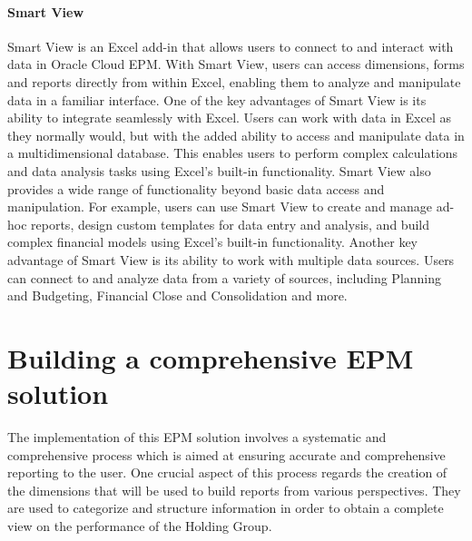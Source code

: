 \documentclass[12pt,a4paper,openright,twoside]{book}
\begin{document}
\paragraph{Smart View}

Smart View is an Excel add-in that allows users to connect to and interact with data in Oracle Cloud EPM. 
%
With Smart View, users can access dimensions, forms and reports directly from within Excel, enabling them to analyze and manipulate data in a familiar interface.
%
One of the key advantages of Smart View is its ability to integrate seamlessly with Excel. 
%
Users can work with data in Excel as they normally would, but with the added ability to access and manipulate data in a multidimensional database. 
%
This enables users to perform complex calculations and data analysis tasks using Excel's built-in functionality.
%
Smart View also provides a wide range of functionality beyond basic data access and manipulation. 
%
For example, users can use Smart View to create and manage ad-hoc reports, design custom templates for data entry and analysis, and build complex financial models using Excel's built-in functionality.
%
Another key advantage of Smart View is its ability to work with multiple data sources. 
%
Users can connect to and analyze data from a variety of sources, including Planning and Budgeting, Financial Close and Consolidation and more. 

\section{Building a comprehensive EPM solution}

The implementation of this EPM solution involves a systematic and comprehensive process which is aimed at ensuring accurate and comprehensive reporting to the user.
%
One crucial aspect of this process regards the creation of the dimensions that will be used to build reports from various perspectives. 
%
They are used to categorize and structure information in order to obtain a complete view on the performance of the Holding Group.
\end{document}
